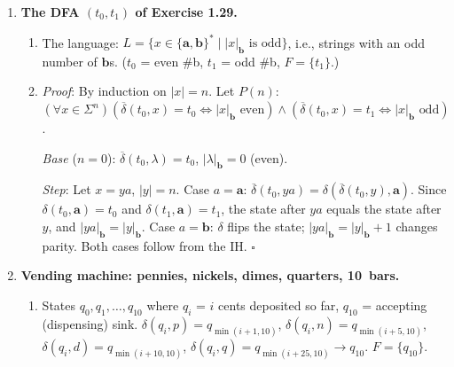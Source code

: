 \documentclass[11pt]{book}
\def\cent{\text{\textcent}}
\def\DBAR{\ensuremath{\overline{\delta}}}
\begin{document}
\begin{enumerate}[{1.}1.]
The original machine tracks deposited amounts in multiples of 5\cent, needing 7 states (0, 5, 10, 15, 20, 25, 30\cent).
Adding pennies requires tracking every cent from 0 to 30, so the minimum number of states is \textbf{31}: states $q_0, q_1, \ldots, q_{30}$ representing $0, 1, \ldots, 30$ cents deposited.
State $q_{30}$ is the accepting (dispensing) state; from $q_{30}$ all additional input is ignored (or loops back).
Each extra penny input on state $q_i$ (for $i < 30$) transitions to $q_{i+1}$.

\item \textbf{The DFA $(t_0, t_1)$ of Exercise 1.29.}

\begin{enumerate}
\item The language: $L = \{x\in\{\mathbf{a},\mathbf{b}\}^* \mid |x|_\mathbf{b}\text{ is odd}\}$, i.e., strings with an odd number of $\mathbf{b}$s. ($t_0$ = even \#b, $t_1$ = odd \#b, $F=\{t_1\}$.)

\item \textit{Proof}: By induction on $|x|=n$. Let $P(n)$: $(\forall x\in\Sigma^n)(\DBAR(t_0,x)=t_0\Leftrightarrow|x|_\mathbf{b}\text{ even})\wedge(\DBAR(t_0,x)=t_1\Leftrightarrow|x|_\mathbf{b}\text{ odd})$.

\textit{Base} ($n=0$): $\DBAR(t_0,\lambda)=t_0$, $|\lambda|_\mathbf{b}=0$ (even). \checkmark

\textit{Step}: Let $x=ya$, $|y|=n$. Case $a=\mathbf{a}$: $\DBAR(t_0,ya)=\delta(\DBAR(t_0,y),\mathbf{a})$. Since $\delta(t_0,\mathbf{a})=t_0$ and $\delta(t_1,\mathbf{a})=t_1$, the state after $ya$ equals the state after $y$, and $|ya|_\mathbf{b}=|y|_\mathbf{b}$. Case $a=\mathbf{b}$: $\delta$ flips the state; $|ya|_\mathbf{b}=|y|_\mathbf{b}+1$ changes parity. Both cases follow from the IH. $\square$
\end{enumerate}

\item \textbf{Vending machine: pennies, nickels, dimes, quarters, 10\cent\ bars.}

\begin{enumerate}
\item States $q_0,q_1,\ldots,q_{10}$ where $q_i$ = $i$ cents deposited so far, $q_{10}$ = accepting (dispensing) sink. $\delta(q_i,p)=q_{\min(i+1,10)}$, $\delta(q_i,n)=q_{\min(i+5,10)}$, $\delta(q_i,d)=q_{\min(i+10,10)}$, $\delta(q_i,q)=q_{\min(i+25,10)}\to q_{10}$. $F=\{q_{10}\}$.


\end{enumerate}
\end{enumerate}
\end{document}
